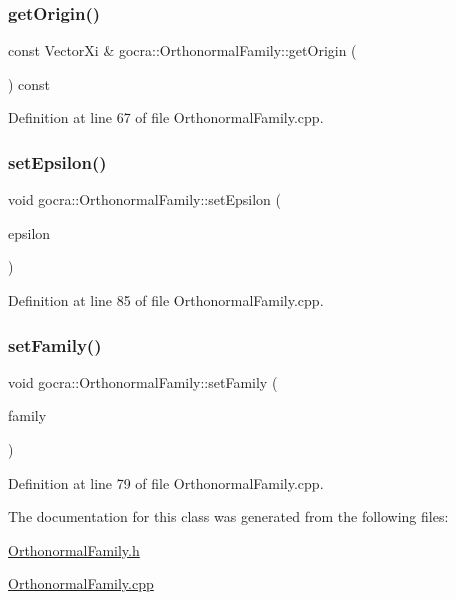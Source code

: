 \subsubsection{\texorpdfstring{get\+Origin()}{getOrigin()}}
{\footnotesize\ttfamily const Vector\+Xi \& gocra\+::\+Orthonormal\+Family\+::get\+Origin (\begin{DoxyParamCaption}{ }\end{DoxyParamCaption}) const}



Definition at line 67 of file Orthonormal\+Family.\+cpp.

\hypertarget{classgocra_1_1OrthonormalFamily_a6a1956253f62f00929b60c848e7b35f5}{}\label{classgocra_1_1OrthonormalFamily_a6a1956253f62f00929b60c848e7b35f5} 
\subsubsection{\texorpdfstring{set\+Epsilon()}{setEpsilon()}}
{\footnotesize\ttfamily void gocra\+::\+Orthonormal\+Family\+::set\+Epsilon (\begin{DoxyParamCaption}\item[{const double}]{epsilon }\end{DoxyParamCaption})}



Definition at line 85 of file Orthonormal\+Family.\+cpp.

\hypertarget{classgocra_1_1OrthonormalFamily_a503aee1056787a99c703ef5af439a9fe}{}\label{classgocra_1_1OrthonormalFamily_a503aee1056787a99c703ef5af439a9fe} 
\subsubsection{\texorpdfstring{set\+Family()}{setFamily()}}
{\footnotesize\ttfamily void gocra\+::\+Orthonormal\+Family\+::set\+Family (\begin{DoxyParamCaption}\item[{const Eigen\+::\+Matrix\+Xd \&}]{family }\end{DoxyParamCaption})}



Definition at line 79 of file Orthonormal\+Family.\+cpp.



The documentation for this class was generated from the following files\+:\begin{DoxyCompactItemize}
\item 
\hyperlink{OrthonormalFamily_8h}{Orthonormal\+Family.\+h}\item 
\hyperlink{OrthonormalFamily_8cpp}{Orthonormal\+Family.\+cpp}\end{DoxyCompactItemize}
